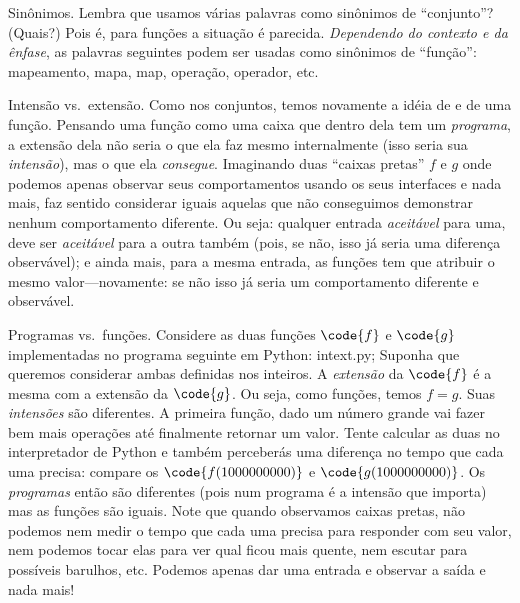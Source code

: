 \note Sinônimos.
%
%
%
%
%
%
%
Lembra que usamos várias palavras como sinônimos de ``conjunto''?
(Quais?)
Pois é, para funções a situação é parecida.
\emph{Dependendo do contexto e da ênfase},
as palavras seguintes podem ser usadas como
sinônimos de ``função'':
mapeamento,
mapa,
map,
operação,
operador,
etc.

\note Intensão vs{.}~extensão.
Como nos conjuntos, temos novamente a idéia de 
e  de uma função.
Pensando uma função como uma caixa que dentro dela tem um \emph{programa},
a extensão dela não seria o que ela faz mesmo internalmente (isso seria sua
\emph{intensão}), mas o que ela \emph{consegue}.
Imaginando duas ``caixas pretas'' $f$ e $g$ onde podemos apenas observar
seus comportamentos usando os seus interfaces e nada mais, faz sentido
considerar iguais aquelas que não conseguimos demonstrar nenhum comportamento diferente.
Ou seja: qualquer entrada \emph{aceitável} para uma, deve ser \emph{aceitável}
para a outra também (pois, se não, isso já seria uma diferença observável);
e ainda mais, para a mesma entrada, as funções tem que atribuir o mesmo
valor---novamente: se não isso já seria um comportamento diferente e
observável.

\note Programas vs.~funções.
Considere as duas funções $\code{f}$ e $\code{g}$ implementadas no programa
seguinte em Python:
\sourcecode intext.py;
\endgraf\noindent
Suponha que queremos considerar ambas definidas nos inteiros.
A \emph{extensão} da $\code{f}$ é a mesma com a extensão da $\code{g}$.
Ou seja, como funções, temos $f = g$.
Suas \emph{intensões} são diferentes.
A primeira função, dado um número grande vai fazer bem mais operações até
finalmente retornar um valor.
Tente calcular as duas no interpretador de Python e também perceberás uma diferença
no tempo que cada uma precisa: compare os
$\code{f(1000000000)}$ e $\code{g(1000000000)}$.
Os \emph{programas} então são diferentes (pois num programa é a intensão que importa)
mas as funções são iguais.
Note que quando observamos caixas pretas, não podemos nem medir o tempo que
cada uma precisa para responder com seu valor, nem podemos tocar elas para ver
qual ficou mais quente, nem escutar para possíveis barulhos, etc.
Podemos apenas dar uma entrada e observar a saída e nada mais!


